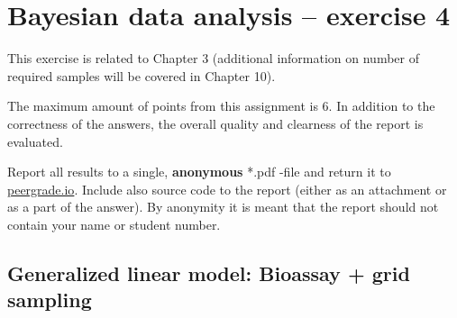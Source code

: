 \documentclass[a4paper,11pt]{article}
\begin{document}
\thispagestyle{empty}

\section*{Bayesian data analysis -- exercise 4}

This exercise is related to Chapter 3 (additional information on
number of required samples will be covered in Chapter 10).

The maximum amount of points from this assignment is 6. In addition to the correctness of the answers, the overall quality and clearness of the report is evaluated.

Report all results to a single, {\bf anonymous} *.pdf -file and return it to \href{peergrade.io}{peergrade.io}. Include also source code to the report (either as an attachment or as a part of the answer). By anonymity it is meant that the report should not contain your name or student number.

\vspace{1cm}


\subsection*{Generalized linear model: Bioassay + grid sampling}
\end{document}

